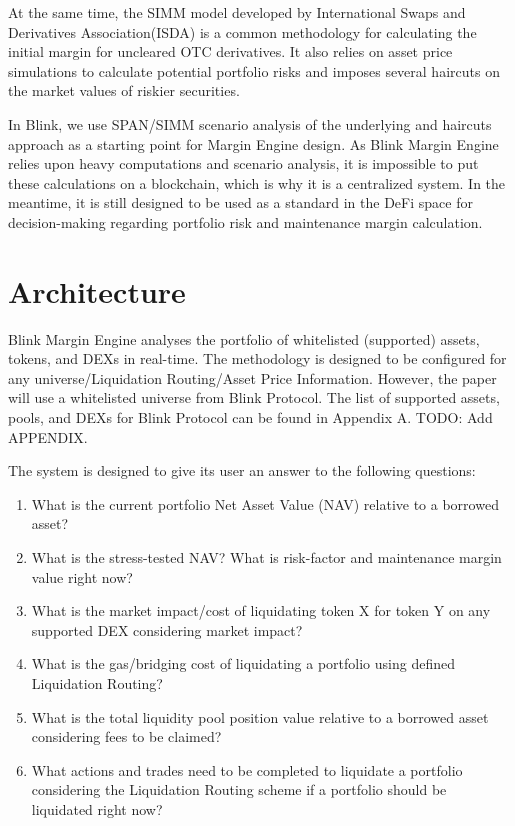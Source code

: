 \documentclass[conference]{IEEEtran}
\begin{document}
At the same time, the SIMM model developed by International Swaps and Derivatives Association(ISDA) is a common methodology for calculating the initial margin for uncleared OTC derivatives. It also relies on asset price simulations to calculate potential portfolio risks and imposes several haircuts on the market values of riskier securities. \cite{simm-whitepaper}

In Blink, we use SPAN/SIMM scenario analysis of the underlying and haircuts approach as a starting point for Margin Engine design. As Blink Margin Engine relies upon heavy computations and scenario analysis, it is impossible to put these calculations on a blockchain, which is why it is a centralized system. In the meantime, it is still designed to be used as a standard in the DeFi space for decision-making regarding portfolio risk and maintenance margin calculation. 

\section {Architecture}

Blink Margin Engine analyses the portfolio of whitelisted (supported) assets, tokens, and DEXs in real-time. 
The methodology is designed to be configured for any universe/Liquidation Routing/Asset Price Information. However, the paper will use a whitelisted universe from Blink Protocol. The list of supported assets, pools, and DEXs for Blink Protocol can be found in Appendix A. TODO: Add APPENDIX.

The system is designed to give its user an answer to the following questions:
  \begin{enumerate}
  \item What is the current portfolio Net Asset Value (NAV) relative to a borrowed asset?
  \item What is the stress-tested NAV? What is risk-factor and maintenance margin value right now?
  \item What is the market impact/cost of liquidating token X for token Y on any supported DEX considering market impact?
  \item What is the gas/bridging cost of liquidating a portfolio using defined Liquidation Routing?
  \item What is the total liquidity pool position value relative to a borrowed asset considering fees to be claimed?
  \item What actions and trades need to be completed to liquidate a portfolio considering the Liquidation Routing scheme if a portfolio should be liquidated right now?
  \end{enumerate}
\end{document}
